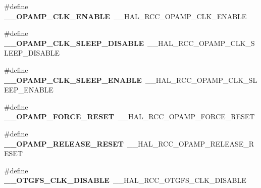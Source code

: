 \begin{DoxyCompactItemize}
\item 
\#define {\bfseries \+\_\+\+\_\+\+O\+P\+A\+M\+P\+\_\+\+C\+L\+K\+\_\+\+E\+N\+A\+B\+LE}~\+\_\+\+\_\+\+H\+A\+L\+\_\+\+R\+C\+C\+\_\+\+O\+P\+A\+M\+P\+\_\+\+C\+L\+K\+\_\+\+E\+N\+A\+B\+LE\hypertarget{group___h_a_l___r_c_c___aliased_ga35ce4b63f0079be9008cdd6466ba22b7}{}\label{group___h_a_l___r_c_c___aliased_ga35ce4b63f0079be9008cdd6466ba22b7}

\item 
\#define {\bfseries \+\_\+\+\_\+\+O\+P\+A\+M\+P\+\_\+\+C\+L\+K\+\_\+\+S\+L\+E\+E\+P\+\_\+\+D\+I\+S\+A\+B\+LE}~\+\_\+\+\_\+\+H\+A\+L\+\_\+\+R\+C\+C\+\_\+\+O\+P\+A\+M\+P\+\_\+\+C\+L\+K\+\_\+\+S\+L\+E\+E\+P\+\_\+\+D\+I\+S\+A\+B\+LE\hypertarget{group___h_a_l___r_c_c___aliased_gad7e06b8ade3d2d9956bf8ec61b5df71f}{}\label{group___h_a_l___r_c_c___aliased_gad7e06b8ade3d2d9956bf8ec61b5df71f}

\item 
\#define {\bfseries \+\_\+\+\_\+\+O\+P\+A\+M\+P\+\_\+\+C\+L\+K\+\_\+\+S\+L\+E\+E\+P\+\_\+\+E\+N\+A\+B\+LE}~\+\_\+\+\_\+\+H\+A\+L\+\_\+\+R\+C\+C\+\_\+\+O\+P\+A\+M\+P\+\_\+\+C\+L\+K\+\_\+\+S\+L\+E\+E\+P\+\_\+\+E\+N\+A\+B\+LE\hypertarget{group___h_a_l___r_c_c___aliased_ga6525dcd963caaf31be5ae47cb6c548d4}{}\label{group___h_a_l___r_c_c___aliased_ga6525dcd963caaf31be5ae47cb6c548d4}

\item 
\#define {\bfseries \+\_\+\+\_\+\+O\+P\+A\+M\+P\+\_\+\+F\+O\+R\+C\+E\+\_\+\+R\+E\+S\+ET}~\+\_\+\+\_\+\+H\+A\+L\+\_\+\+R\+C\+C\+\_\+\+O\+P\+A\+M\+P\+\_\+\+F\+O\+R\+C\+E\+\_\+\+R\+E\+S\+ET\hypertarget{group___h_a_l___r_c_c___aliased_gac393453e90d645ba3ebf635611fe7a9b}{}\label{group___h_a_l___r_c_c___aliased_gac393453e90d645ba3ebf635611fe7a9b}

\item 
\#define {\bfseries \+\_\+\+\_\+\+O\+P\+A\+M\+P\+\_\+\+R\+E\+L\+E\+A\+S\+E\+\_\+\+R\+E\+S\+ET}~\+\_\+\+\_\+\+H\+A\+L\+\_\+\+R\+C\+C\+\_\+\+O\+P\+A\+M\+P\+\_\+\+R\+E\+L\+E\+A\+S\+E\+\_\+\+R\+E\+S\+ET\hypertarget{group___h_a_l___r_c_c___aliased_ga0730e1df8bbed2f4b2174739fdb629ba}{}\label{group___h_a_l___r_c_c___aliased_ga0730e1df8bbed2f4b2174739fdb629ba}

\item 
\#define {\bfseries \+\_\+\+\_\+\+O\+T\+G\+F\+S\+\_\+\+C\+L\+K\+\_\+\+D\+I\+S\+A\+B\+LE}~\+\_\+\+\_\+\+H\+A\+L\+\_\+\+R\+C\+C\+\_\+\+O\+T\+G\+F\+S\+\_\+\+C\+L\+K\+\_\+\+D\+I\+S\+A\+B\+LE\hypertarget{group___h_a_l___r_c_c___aliased_gae094c2bb538319468322f107da0e0928}{}\label{group___h_a_l___r_c_c___aliased_gae094c2bb538319468322f107da0e0928}


\end{DoxyCompactItemize}
